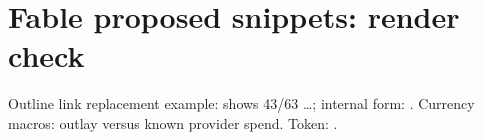 \documentclass[11pt,letterpaper]{article}
\begin{document}
\section*{Fable proposed snippets: render check}
Outline link replacement example:  shows 43/63 \ldots; internal form: . Currency macros:  outlay versus  known provider spend. Token: .
\begin{landscape}\end{landscape}
\clearpage
\begin{landscape}\end{landscape}
\clearpage
\begin{landscape}\end{landscape}
\clearpage

\clearpage
\begin{landscape}\end{landscape}
\clearpage

\end{document}
